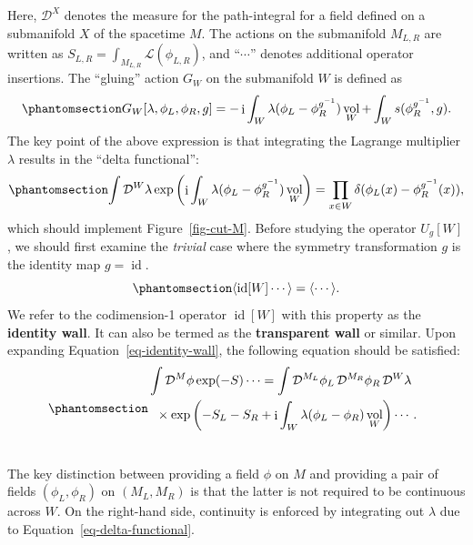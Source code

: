 \documentclass[11pt,toc=bibliography]{scrbook}
\DeclareMathOperator{\vol}{vol}
\DeclareMathOperator{\imunit}{i}
\DeclareMathOperator{\id}{id}
\numberwithin{equation}{section}
\DeclareMathOperator{\vol}{vol}
\DeclareMathOperator{\imunit}{i}
\DeclareMathOperator{\id}{id}
\begin{document}
Here, \(\mathcal{D}^{X}\) denotes the measure for the path-integral for
a field defined on a submanifold \(X\) of the spacetime \(M\). The
actions on the submanifold \(M_{L,R}\) are written as
\(S_{L,R} = \int_{M_{L,R}}\mathcal{L}(\phi_{L,R})\), and ``\(\cdots\)''
denotes additional operator insertions. The ``gluing'' action \(G_W\) on
the submanifold \(W\) is defined as
\begin{equation}\phantomsection\label{eq-gluing-action}{
    G_W[\lambda,\phi_L,\phi_R,g] = - \imunit \int_W \lambda(\phi_L - \phi_R^{g^{-1}})\vol_W+\int_W s(\phi_R^{g^{-1}},g).
}\end{equation} The key point of the above expression is that
integrating the Lagrange multiplier \(\lambda\) results in the ``delta
functional'':
\begin{equation}\phantomsection\label{eq-delta-functional}{
    \int \mathop{\mathcal{D}^W\lambda} \exp\left(\imunit \int_W \lambda (\phi_L-\phi^{g^{-1}}_R)\vol_W\right)
     = \prod_{x\in W}\delta(\phi_L(x) - \phi_R^{g^{-1}}(x)),
}\end{equation} which should implement Figure~\ref{fig-cut-M}. Before
studying the operator \(U_g[W]\), we should first examine the
\emph{trivial} case where the symmetry transformation \(g\) is the
identity map \(g=\id\).
\begin{equation}\phantomsection\label{eq-identity-wall}{
\langle \id[W] \cdots \rangle = \langle \cdots \rangle.
}\end{equation} We refer to the codimension-1 operator \(\id[W]\) with
this property as the \textbf{identity wall}. It can also be termed as
the \textbf{transparent wall} or similar. Upon expanding
Equation~\ref{eq-identity-wall}, the following equation should be
satisfied: \begin{equation}\phantomsection\label{eq-trivial-scalar}{
\begin{multlined}
    \int \mathop{\mathcal{D}^M\phi} \exp(-S) \cdots=
    \int \mathop{\mathcal{D}^{M_L}\phi_L} \mathop{\mathcal{D}^{M_R}\phi_R} \mathop{\mathcal{D}^W\lambda} \\ \times \exp\left(-S_L-S_R+\imunit \int_W \lambda(\phi_L - \phi_R)\vol_W\right)\cdots.\\ 
\end{multlined}
}\end{equation}

The key distinction between providing a field \(\phi\) on \(M\) and
providing a pair of fields \((\phi_L,\phi_R)\) on \((M_L,M_R)\) is that
the latter is not required to be continuous across \(W\). On the
right-hand side, continuity is enforced by integrating out \(\lambda\)
due to Equation~\ref{eq-delta-functional}.
\end{document}
